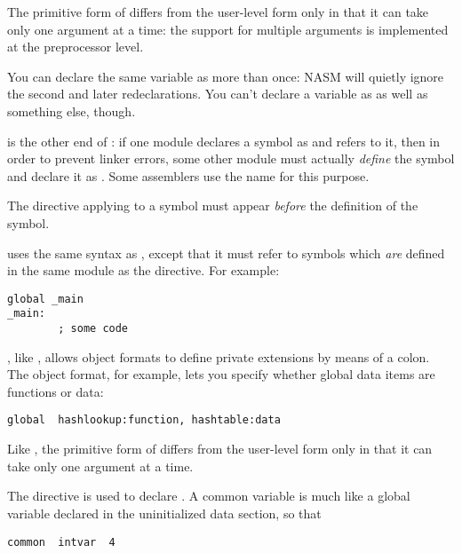 The primitive form of  differs from the user-level form
only in that it can take only one argument at a time: the support
for multiple arguments is implemented at the preprocessor level.

You can declare the same variable as  more than once:
NASM will quietly ignore the second and later redeclarations.
You can't declare a variable as  as well as something
else, though.


 is the other end of : if one module declares a
symbol as  and refers to it, then in order to prevent
linker errors, some other module must actually \emph{define} the
symbol and declare it as . Some assemblers use the name
 for this purpose.

The  directive applying to a symbol must appear \emph{before}
the definition of the symbol.

 uses the same syntax as , except that it must
refer to symbols which \emph{are} defined in the same module as the
 directive. For example:

\begin{lstlisting}
global _main
_main:
        ; some code
\end{lstlisting}

, like , allows object formats to define private
extensions by means of a colon. The  object format, for
example, lets you specify whether global data items are functions or
data:

\begin{lstlisting}
global  hashlookup:function, hashtable:data
\end{lstlisting}

Like , the primitive form of  differs
from the user-level form only in that it can take only one argument
at a time.


The  directive is used to declare . A common variable is much like a global variable declared
in the uninitialized data section, so that

\begin{lstlisting}
common  intvar  4
\end{lstlisting}

